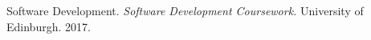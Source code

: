 \documentclass[12pt,a4paper]{article}
\begin{document}
\newpage


\begin{thebibliography}{100}

 Software Development. {\em Software Development Coursework.} University of Edinburgh. 2017.


\end{thebibliography}
\end{document}
